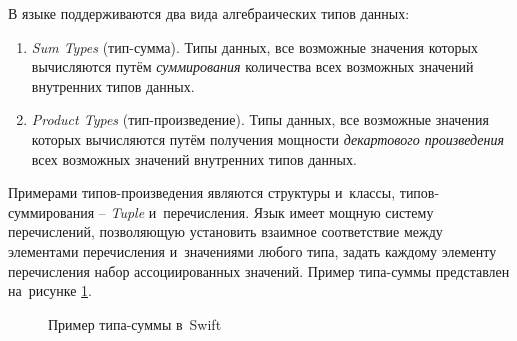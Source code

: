 В языке поддерживаются два вида алгебраических типов данных:

\begin{enumerate}
	\item \emph{Sum Types} (тип-сумма). Типы данных, все возможные значения которых вычисляются путём \textit{суммирования} количества всех возможных значений внутренних типов данных.
	\item \emph{Product Types} (тип-произведение). Типы данных, все возможные значения которых вычисляются путём получения мощности \textit{декартового произведения} всех возможных значений внутренних типов данных.
\end{enumerate}

Примерами типов-произведения являются структуры и~классы, типов-суммирования -- \textit{Tuple} и~перечисления. Язык имеет мощную систему перечислений, позволяющую установить взаимное соответствие между элементами перечисления и~значениями любого типа, задать каждому элементу перечисления набор ассоциированных значений. Пример типа-суммы представлен на~рисунке \ref{sec:development:arch:ios:swift:code:barcode}.

\begin{figure}[h]
	
   \caption{Пример типа-суммы в~Swift}
   \label{sec:development:arch:ios:swift:code:barcode}
\end{figure}